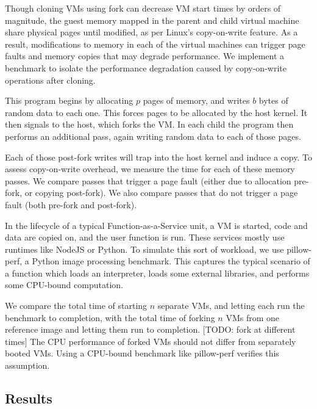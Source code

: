  Though cloning VMs using fork can decrease
VM start times by orders of magnitude, the guest memory mapped in the parent
and child virtual machine share physical pages until modified, as per Linux's
copy-on-write feature. As a result, modifications to memory in each of the
virtual machines can trigger page faults and memory copies that may degrade
performance. We implement a benchmark to isolate the performance degradation
caused by copy-on-write operations after cloning.

This program begins by allocating $p$ pages of memory, and writes $b$ bytes of
random data to each one. This forces pages to be allocated by the host kernel.
It then signals to the host, which forks the VM. In each child the program then
performs an additional pass, again writing random data to each of those pages.

Each of those post-fork writes will trap into the host kernel and induce a
copy. To assess copy-on-write overhead, we measure the time for each of these
memory passes. We compare passes that trigger a page fault (either due to
allocation pre-fork, or copying post-fork). We also compare passes that do not
trigger a page fault (both pre-fork and post-fork).

In the lifecycle of a typical Function-as-a-Service unit, a VM is started, code
and data are copied on, and the user function is run. These services mostly use
runtimes like NodeJS or Python. To simulate this sort of workload, we use
pillow-perf, a Python image processing benchmark. This captures the typical
scenario of a function which loads an interpreter, loads some external
libraries, and performs some CPU-bound computation.

We compare the total time of starting $n$ separate VMs, and letting each run
the benchmark to completion, with the total time of forking $n$ VMs from one
reference image and letting them run to completion. [TODO: fork at different
times] The CPU performance of forked VMs should not differ from separately
booted VMs. Using a CPU-bound benchmark like pillow-perf verifies this
assumption.

\subsection{Results}

